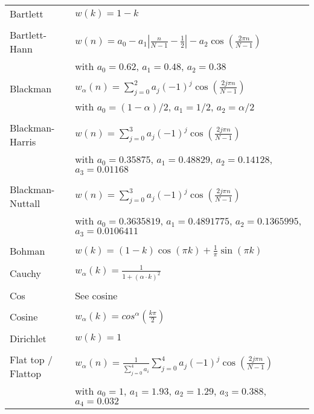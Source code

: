 \begin{longtable}{|p{3.1cm}p{10cm}|}
\hline
Bartlett & 
      $\displaystyle w(k) = 1 - k$ \\
&\\ Bartlett-Hann &
   $\displaystyle w(n) = a_0 -
   a_1\left\vert \frac{n}{N-1}- \frac{1}{2}\right\vert -
   a_2\cos\left(\frac{2\pi n}{N-1}\right)$ \\ 
  & \footnotesize with $a_0 = 0.62$, $a_1 = 0.48$, $a_2 = 0.38$ \\
&\\ Blackman &
   $\displaystyle w_{\alpha}(n) = \sum_{j=0}^2 a_j(-1)^j \cos\left(\frac{2j\pi
   n}{N-1}\right)$ \\
  & \footnotesize with $a_0 = (1-\alpha)/2$, $a_1 = 1/2$, $a_2 = \alpha / 2$ \\
&\\ Blackman-Harris &
   $\displaystyle w(n) = \sum_{j=0}^3 a_j(-1)^j \cos\left(\frac{2j\pi
   n}{N-1}\right)$ \\
  & \footnotesize with $a_0 = 0.35875$, $a_1 = 0.48829$, $a_2 = 0.14128$, $a_3 = 0.01168$ \\
&\\ Blackman-Nuttall &
   $\displaystyle w(n) = \sum_{j=0}^3 a_j(-1)^j \cos\left(\frac{2j\pi
   n}{N-1}\right)$ \\
  & \footnotesize with $a_0 = 0.3635819$, $a_1 = 0.4891775$,
   $a_2 = 0.1365995$, $a_3 = 0.0106411$ \\
&\\ Bohman &
   $\displaystyle w(k) = (1 - k)
   \cos(\pi k) +
   \frac{1}{\pi}\sin(\pi k) $ \\
&\\ Cauchy &
   $\displaystyle w_{\alpha}(k) = \frac{1}{1 + (\alpha\cdot k)^2}$ \\
&\\ Cos & See cosine \\
&\\ Cosine &
   $\displaystyle w_{\alpha}(k) = cos^{\alpha}\left(\frac{k\pi}{2}\right)$ \\
&\\ Dirichlet & 
   $\displaystyle w(k) = 1$ \\
&\\ Flat top / Flattop&
   $\displaystyle w_{\alpha}(n) = \textstyle\frac{1}{\sum_{j=0}^4 a_i}
   \displaystyle \sum_{j=0}^4 a_j(-1)^j \cos\left(\frac{2j\pi
   n}{N-1}\right)$ \\
  & \footnotesize with $a_0 = 1$, $a_1 = 1.93$, $a_2 = 1.29$, $a_3 =
  0.388$, $a_4 = 0.032$ \\

\end{longtable}
